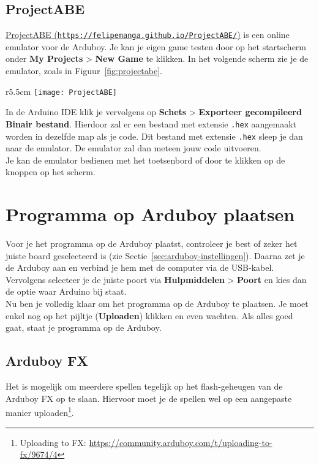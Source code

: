 \documentclass[11pt,fleqn]{book} %
\begin{document}
\subsection{ProjectABE}
\href{https://felipemanga.github.io/ProjectABE/}{ProjectABE (\texttt{https://felipemanga.github.io/ProjectABE/})} is een online emulator voor de Arduboy.
Je kan je eigen game testen door op het startscherm onder \textbf{My Projects} > \textbf{New Game} te klikken. In het volgende scherm zie je de emulator, zoals in Figuur~\ref{fig:projectabe}.
\begin{wrapfigure}{r}{5.5cm}
	\centering
	\texttt{[image: ProjectABE]}
	\caption{Project ABE}
	\label{fig:projectabe}
\end{wrapfigure}
In de Arduino IDE klik je vervolgens op \textbf{Schets} > \textbf{Exporteer gecompileerd Binair bestand}. Hierdoor zal er een bestand met extensie \texttt{.hex} aangemaakt worden in dezelfde map als je code. Dit bestand met extensie \texttt{.hex} sleep je dan naar de emulator. De emulator zal dan meteen jouw code uitvoeren.\\
Je kan de emulator bedienen met het toetsenbord of door te klikken op de knoppen op het scherm.

\section{Programma op Arduboy plaatsen}
Voor je het programma op de Arduboy plaatst, controleer je best of zeker het juiste board geselecteerd is (zie Sectie~\ref{sec:arduboy-instellingen}). Daarna zet je de Arduboy aan en verbind je hem met de computer via de USB-kabel. Vervolgens selecteer je de juiste poort via \textbf{Hulpmiddelen} > \textbf{Poort} en kies dan de optie waar Arduino bij staat.\\
Nu ben je volledig klaar om het programma op de Arduboy te plaatsen. Je moet enkel nog op het pijltje (\textbf{Uploaden}) klikken en even wachten. Als alles goed gaat, staat je programma op de Arduboy.

\subsection{Arduboy FX}
Het is mogelijk om meerdere spellen tegelijk op het flash-geheugen van de Arduboy FX op te slaan. Hiervoor moet je de spellen wel op een aangepaste manier uploaden\footnote{Uploading to FX: \url{https://community.arduboy.com/t/uploading-to-fx/9674/4}}.
\end{document}
